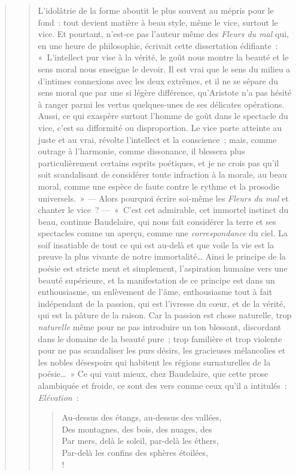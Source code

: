 \documentclass[french,twoside]{book} %
\begin{document}
\begin{verse}
\begin{verse}
L’idolâtrie de la forme aboutit le plus souvent au mépris pour le fond : tout devient matière à beau style, même le vice, surtout le vice. Et pourtant, n’est-ce pas l’auteur même des \emph{Fleurs du mal} qui, en une heure de philosophie, écrivait cette dissertation édifiante : « L’intellect pur vise à la vérité, le goût nous montre la beauté et le sens moral nous enseigne le devoir. Il est vrai que le sens du milieu a d’intimes connexions avec les deux extrêmes, et il ne se sépare du sens moral que par une si légère différence, qu’Aristote n’a pas hésité à ranger parmi les vertus quelques-unes de ses délicates opérations. Aussi, ce qui exaspère surtout l’homme de goût dans le spectacle du vice, c’est sa difformité ou disproportion. Le vice porte atteinte au juste et au vrai, révolte l’intellect et la conscience ; mais, comme outrage à l’harmonie, comme dissonance, il blessera plus particulièrement certains esprits poétiques, et je ne crois pas qu’il soit scandalisant de considérer toute infraction à la morale, au beau moral, comme une espèce de faute contre le rythme et la prosodie universels. » — Alors pourquoi écrire soi-même les \emph{Fleurs du mal} et chanter le vice ? — « C’est cet admirable, cet immortel instinct du beau, continue Baudelaire, qui nous fait considérer la terre et ses spectacles comme un aperçu, comme une \emph{correspondance} du ciel. La soif insatiable de tout ce qui est au-delà et que voile la vie est la preuve la plus vivante de notre immortalité… Ainsi le principe de la poésie est stricte ment et simplement, l’aspiration humaine vers une beauté supérieure, et la manifestation de ce principe est dans un enthousiasme, un enlèvement de l’âme, enthousiasme tout à fait indépendant de la passion, qui est l’ivresse du cœur, et de la vérité, qui est la pâture de la raison. Car la passion est chose naturelle, trop \emph{naturelle} même pour ne pas introduire un ton blessant, discordant dans le domaine de la beauté pure ; trop familière et trop violente pour ne pas scandaliser les purs désirs, les gracieuses mélancolies et les nobles désespoirs qui habitent les régions surnaturelles de la poésie… » Ce qui vaut mieux, chez Baudelaire, que cette prose alambiquée et froide, ce sont des vers comme ceux qu’il a intitulés : \emph{Elévation} :\par


\begin{verse}
Au-dessus des étangs, au-dessus des vallées,\\
Des montagnes, des bois, des nuages, des\\
Par mers, delà le soleil, par-delà les éthers,\\
Par-delà les confins des sphères étoilées,\\!


\end{verse}
\end{verse}
\end{verse}
\end{document}
